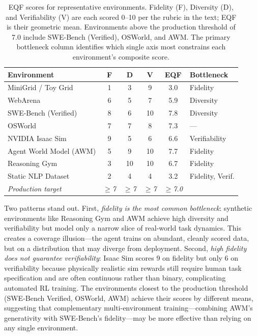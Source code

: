\begin{table}[tbp]
\centering
\footnotesize
\begin{tabularx}{\textwidth}{Ycccc>{\raggedright\arraybackslash}p{3.2cm}}
\toprule
\textbf{Environment} & \textbf{F} & \textbf{D} & \textbf{V} & \textbf{EQF} & \textbf{Bottleneck} \\
\midrule
MiniGrid / Toy Grid & 1 & 3 & 9 & 3.0 & Fidelity \\
WebArena            & 6 & 5 & 7 & 5.9 & Diversity \\
SWE-Bench (Verified)& 8 & 6 & 10 & 7.8 & Diversity \\
OSWorld             & 7 & 7 & 8  & 7.3 & --- \\
NVIDIA Isaac Sim    & 9 & 5 & 6  & 6.6 & Verifiability \\
Agent World Model (AWM) & 5 & 9 & 10 & 7.7 & Fidelity \\
Reasoning Gym       & 3 & 10 & 10 & 6.7 & Fidelity \\
Static NLP Dataset  & 2 & 4 & 4  & 3.2 & Fidelity, Verif. \\
\midrule
\emph{Production target} & \emph{$\geq$7} & \emph{$\geq$7} & \emph{$\geq$7} & \emph{$\geq$7.0} & \\
\bottomrule
\end{tabularx}
\caption{EQF scores for representative environments. Fidelity (F), Diversity (D), and Verifiability (V) are each scored 0--10 per the rubric in the text; EQF is their geometric mean. Environments above the production threshold of 7.0 include SWE-Bench (Verified), OSWorld, and AWM. The primary bottleneck column identifies which single axis most constrains each environment's composite score.}
\label{tbl:eqf-scores}
\end{table}

Two patterns stand out. First, \emph{fidelity is the most common bottleneck}: synthetic environments like Reasoning Gym and AWM achieve high diversity and verifiability but model only a narrow slice of real-world task dynamics. This creates a coverage illusion---the agent trains on abundant, cleanly scored data, but on a distribution that may diverge from deployment. Second, \emph{high fidelity does not guarantee verifiability}: Isaac Sim scores 9 on fidelity but only 6 on verifiability because physically realistic sim rewards still require human task specification and are often continuous rather than binary, complicating automated RL training. The environments closest to the production threshold (SWE-Bench Verified, OSWorld, AWM) achieve their scores by different means, suggesting that complementary multi-environment training---combining AWM's generativity with SWE-Bench's fidelity---may be more effective than relying on any single environment.

